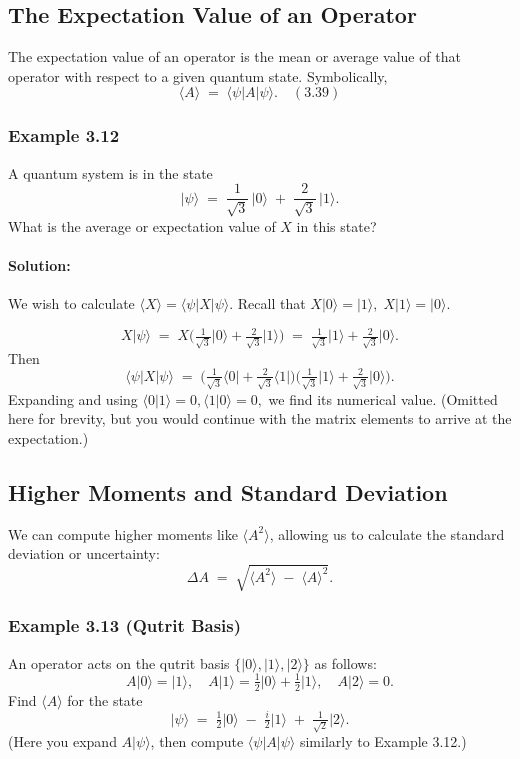\documentclass{article}
\begin{document}
\subsection{The Expectation Value of an Operator}
The expectation value of an operator is the mean or average value of that operator with respect to a given quantum state. Symbolically,
\[
\langle A \rangle \;=\; \langle \psi \lvert A \lvert \psi \rangle. \quad (3.39)
\]

\subsubsection{Example 3.12}
A quantum system is in the state
\[
\lvert\psi\rangle \;=\; \frac{1}{\sqrt{3}}\,\lvert 0\rangle \;+\; \frac{2}{\sqrt{3}}\,\lvert 1\rangle.
\]
What is the average or expectation value of \(X\) in this state?

\paragraph{Solution:}
We wish to calculate \(\langle X \rangle = \langle \psi \lvert X \lvert \psi \rangle.\)
Recall that \(X \lvert 0\rangle = \lvert 1\rangle,\; X \lvert 1\rangle = \lvert 0\rangle.\)

\[
X \lvert \psi\rangle \;=\; X \biggl(\tfrac{1}{\sqrt{3}}\lvert 0\rangle + \tfrac{2}{\sqrt{3}}\lvert 1\rangle\biggr)
\;=\; \tfrac{1}{\sqrt{3}}\lvert 1\rangle + \tfrac{2}{\sqrt{3}}\lvert 0\rangle.
\]
Then
\[
\langle \psi \lvert X \lvert \psi\rangle 
\;=\; \bigl(\tfrac{1}{\sqrt{3}}\langle 0\rvert + \tfrac{2}{\sqrt{3}}\langle 1\rvert\bigr)
\bigl(\tfrac{1}{\sqrt{3}}\lvert 1\rangle + \tfrac{2}{\sqrt{3}}\lvert 0\rangle\bigr).
\]
Expanding and using \(\langle 0\vert 1\rangle=0, \langle 1\vert 0\rangle=0,\) we find its numerical value. (Omitted here for brevity, but you would continue with the matrix elements to arrive at the expectation.)

\subsection{Higher Moments and Standard Deviation}
We can compute higher moments like \(\langle A^2\rangle\), allowing us to calculate the standard deviation or uncertainty:
\[
\Delta A \;=\; \sqrt{\langle A^2\rangle \;-\; \langle A\rangle^2}.
\]

\subsubsection{Example 3.13 (Qutrit Basis)}
An operator acts on the qutrit basis \(\{\lvert 0\rangle, \lvert 1\rangle, \lvert 2\rangle \}\) as follows:
\[
A\lvert 0\rangle = \lvert 1\rangle, \quad
A\lvert 1\rangle
= \tfrac{1}{2}\lvert 0\rangle + \tfrac{1}{2}\lvert 1\rangle,\quad
A\lvert 2\rangle = 0.
\]
Find \(\langle A \rangle\) for the state
\[
\lvert \psi\rangle \;=\; \tfrac{1}{2}\lvert 0\rangle
\;-\; \tfrac{i}{2} \lvert 1\rangle
\;+\; \tfrac{1}{\sqrt{2}} \lvert 2\rangle.
\]
(Here you expand \(A\lvert\psi\rangle\), then compute \(\langle \psi \lvert A \lvert \psi\rangle\) similarly to Example 3.12.)
\end{document}
